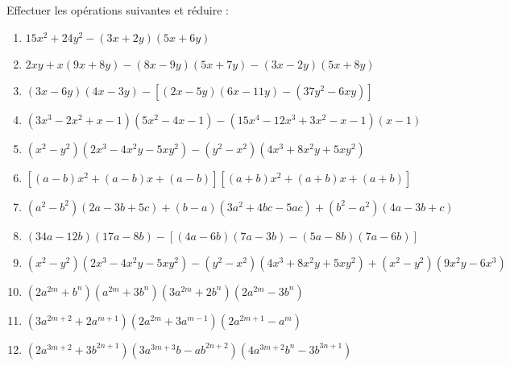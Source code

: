 \begin{exercice}
Effectuer les opérations suivantes et réduire :
\begin{enumerate}
\item $15{{x}^{2}}+24{{y}^{2}}-\left( 3x+2y \right)\left( 5x+6y \right)$
\item $2xy+x\left( 9x+8y \right)-\left( 8x-9y \right)\left( 5x+7y \right)-\left( 3x-2y \right)\left( 5x+8y \right)$
\item $\left( 3x-6y \right)\left( 4x-3y \right)-\left[ \left( 2x-5y \right)\left( 6x-11y \right)-\left( 37{{y}^{2}}-6xy \right) \right]$
\item $\left( 3{{x}^{3}}-2{{x}^{2}}+x-1 \right)\left( 5{{x}^{2}}-4x-1 \right)-\left( 15{{x}^{4}}-12{{x}^{3}}+3{{x}^{2}}-x-1 \right)\left( x-1 \right)$
\item $\left( {{x}^{2}}-{{y}^{2}} \right)\left( 2{{x}^{3}}-4{{x}^{2}}y-5x{{y}^{2}} \right)-\left( {{y}^{2}}-{{x}^{2}} \right)\left( 4{{x}^{3}}+8{{x}^{2}}y+5x{{y}^{2}} \right)$
\item $\left[ \left( a-b \right){{x}^{2}}+\left( a-b \right)x+\left( a-b \right) \right]\left[ \left( a+b \right){{x}^{2}}+\left( a+b \right)x+\left( a+b \right) \right]$
\item $\left( {{a}^{2}}-{{b}^{2}} \right)\left( 2a-3b+5c \right)+\left( b-a \right)\left( 3{{a}^{2}}+4bc-5ac \right)+\left( {{b}^{2}}-{{a}^{2}} \right)\left( 4a-3b+c \right)$
\item $\left( 34a-12b \right)\left( 17a-8b \right)-\left[ \left( 4a-6b \right)\left( 7a-3b \right)-\left( 5a-8b \right)\left( 7a-6b \right) \right]$
\item $\left( {{x}^{2}}-{{y}^{2}} \right)\left( 2{{x}^{3}}-4{{x}^{2}}y-5x{{y}^{2}} \right)-\left( {{y}^{2}}-{{x}^{2}} \right)\left( 4{{x}^{3}}+8{{x}^{2}}y+5x{{y}^{2}} \right)+\left( {{x}^{2}}-{{y}^{2}} \right)\left( 9{{x}^{2}}y-6{{x}^{3}} \right)$ 
\item $\left( 2{{a}^{2m}}+{{b}^{n}} \right)\left( {{a}^{2m}}+3{{b}^{n}} \right)\left( 3{{a}^{2m}}+2{{b}^{n}} \right)\left( 2{{a}^{2m}}-3{{b}^{n}} \right)$
\item $\left( 3{{a}^{2m+2}}+2{{a}^{m+1}} \right)\left( 2{{a}^{2m}}+3{{a}^{m-1}} \right)\left( 2{{a}^{2m+1}}-{{a}^{m}} \right)$
\item $\left( 2{{a}^{3m+2}}+3{{b}^{2n+1}} \right)\left( 3{{a}^{3m+3}}b-a{{b}^{2n+2}} \right)\left( 4{{a}^{3m+2}}{{b}^{n}}-3{{b}^{3n+1}} \right)$
\end{enumerate}
\end{exercice}



